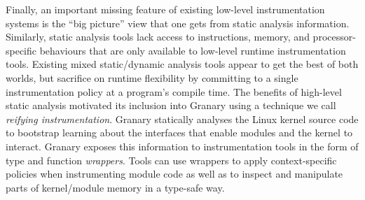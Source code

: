 \documentclass[preprint]{sigplanconf}
\begin{document}
Finally, an important missing feature of existing low-level instrumentation systems is the ``big picture'' view that one gets from static analysis information. Similarly, static analysis tools lack access to instructions, memory, and processor-specific behaviours that are only available to low-level runtime instrumentation tools. Existing mixed static/dynamic analysis tools \cite{NaCl,AddressSanitizer,ThreadSanitizer} appear to get the best of both worlds, but sacrifice on runtime flexibility by committing to a single instrumentation policy at a program's compile time. The benefits of high-level static analysis motivated its inclusion into Granary using a technique we call \emph{reifying instrumentation}. Granary statically analyses the Linux kernel source code to bootstrap learning about  the interfaces that enable modules and the kernel to interact. Granary exposes this information to instrumentation tools in the form of type and function \emph{wrappers}. Tools can use wrappers to apply context-specific policies when instrumenting module code as well as to inspect and manipulate parts of kernel/module memory in a type-safe way.


\end{document}

